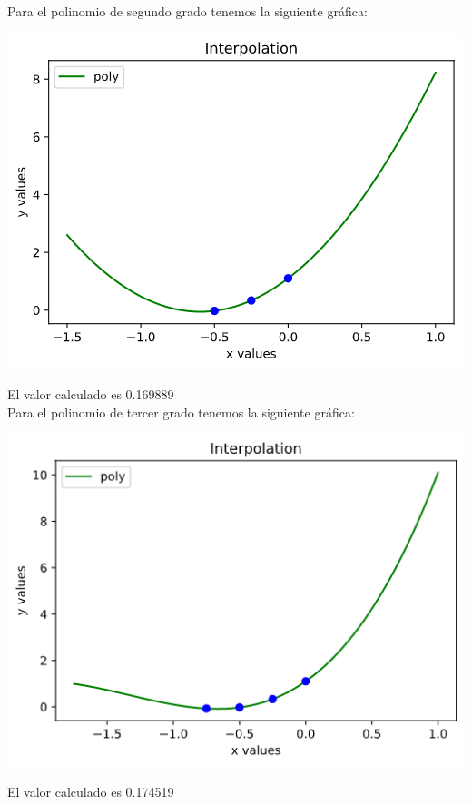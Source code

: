 \documentclass{article}
\begin{document}
Para el polinomio de segundo grado tenemos la siguiente gráfica:
\begin{center}
\includegraphics[scale=0.75]{grafica2-2.png}
\end{center}
El valor calculado es 0.169889\\

Para el polinomio de tercer grado tenemos la siguiente gráfica:
\begin{center}
\includegraphics[scale=0.75]{grafica2-3.png}
\end{center}
El valor calculado es 0.174519
\end{document}
